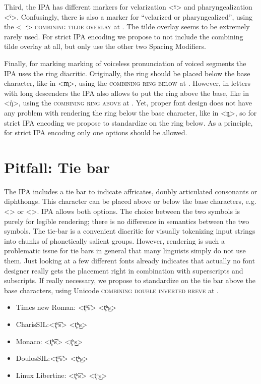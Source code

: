 Third, the IPA has different markers for velarization <ˠ> and pharyngealization
<ˤ>. Confusingly, there is also a marker for ``velarized or pharyngealized'',
using the <\ \ {\large ̴}> \textsc{combining tilde overlay} at . The
tilde overlay seems to be extremely rarely used. For strict IPA encoding we
propose to not include the combining tilde overlay at all, but only use the 
other two Spacing Modifiers.

Finally, for marking marking of voiceless pronunciation of voiced segments the IPA
uses the ring diacritic. Originally, the ring should be placed below the 
base character, like in <m̥>, using the \textsc{combining ring below} at . 
However, in letters with long descenders the IPA also allows to put the ring 
above the base, like in <ŋ̊>, using the \textsc{combining ring above} at 
. Yet, proper font design does not have any problem with rendering 
the ring below the base character, like in <ŋ̥>, so for strict IPA encoding we 
propose to standardize on the ring below. As a principle, for strict IPA 
encoding only one options should be allowed.

\section{Pitfall: Tie bar}
\label{pitfall-tie-bar}

The IPA includes a tie bar to indicate affricates, doubly articulated consonants
or diphthongs. This character can be placed above or below the base characters,
e.g. <> or <>. IPA allows both options. The choice
between the two symbols is purely for legible rendering; there is no difference
in semantics between the two symbols. The tie-bar is a convenient diacritic for
visually tokenizing input strings into chunks of phonetically salient groups.
However, rendering is such a problematic issue for tie bars in general that many
linguists simply do not use them. Just looking at a few different fonts already
indicates that actually no font designer really gets the placement right in
combination with superscripts and subscripts. If really necessary, we propose to
standardize on the tie bar above the base characters, using Unicode
\textsc{combining double inverted breve} at .

\begin{itemize}
  \item[] {Times new Roman: <t̥ʰ͡s> <t̥ʰ͜s>}
  \item[] {\small {}CharisSIL:\@ <t̥ʰ͡s> <t̥ʰ͜s>}
  \item[] {\footnotesize {}Monaco: <t̥ʰ͡s> <t̥ʰ͜s>}
  \item[] {DoulosSIL:\@ <t̥ʰ͡s> <t̥ʰ͜s>}
  \item[] Linux Libertine: <t̥ʰ͡s> <t̥ʰ͜s>
\end{itemize}


